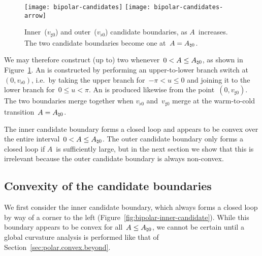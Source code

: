 \begin{figure}
  \centering
  \texttt{[image: bipolar-candidates]}
  \texttt{[image: bipolar-candidates-arrow]}
  \caption{
    Inner~($v_{\sharp 0}$) and outer~($v_{\flat 0}$) candidate boundaries,
    as $A$~increases.
    The two candidate boundaries become one at~$A = A_{\natural 0}$.
  }
  \label{fig:bipolar-candidates}
\end{figure}

We may therefore construct (up to) two 
whenever~$0 < A \le A_{\natural 0}$,
as shown in Figure~\ref{fig:bipolar-candidates}.
An  is constructed
by performing an upper-to-lower branch switch at~$(0, v_{\flat 0})$,
i.e.~by taking the upper branch for~$-\pi < u \le 0$
and joining it to the lower branch for~$0 \le u < \pi$.
An  is produced likewise
from the point~$(0, v_{\sharp 0})$.
The two boundaries merge together
when $v_{\flat 0}$ and~$v_{\sharp 0}$ merge
at the warm-to-cold transition~$A = A_{\natural 0}$.

The inner candidate boundary forms a closed loop
and appears to be convex over the entire interval~$0 < A \le A_{\natural 0}$.
The outer candidate boundary only forms a closed loop
if $A$~is sufficiently large,
but in the next section we show that this is irrelevant
because the outer candidate boundary is always non-convex.

\subsection{Convexity of the candidate boundaries}
\label{sec:bipolar.tracing.convex}

We first consider the inner candidate boundary,
which always forms a closed loop
by way of a corner to the left
(Figure~\ref{fig:bipolar-inner-candidate}).
While this boundary appears to be convex for all~$A \le A_{\natural 0}$,
we cannot be certain until a global curvature analysis is performed
like that of Section~\ref{sec:polar.convex.beyond}.

\begin{figure}
\end{figure}

